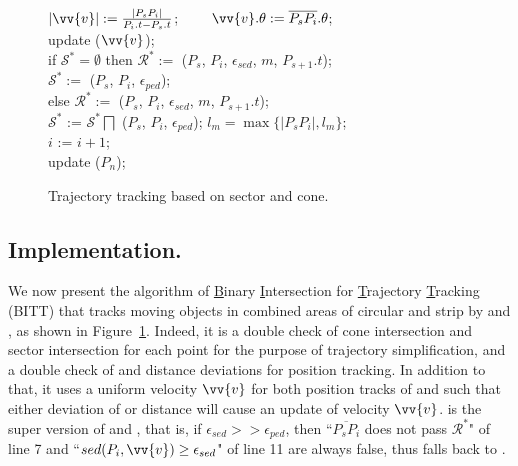 \begin{figure}[tb!]
\begin{center}
{\begin{minipage}{3.3in}
{					\icc \>\hspace{7ex}    $|\vv{v}|:=\frac{|P_sP_{i}|}{P_{i}.t-P_s.t}$; ~~~~$\vv{v}.\theta:=\overline{P_sP_{i}}.\theta$; \\
					\icc \>\hspace{7ex}    update ($\vv{v}$); \\
					\icc \>\hspace{3ex} if $\mathcal{S}^*=\emptyset$ then $\mathcal{R}^*:=$ ($P_s$, $P_{i}$, $\epsilon_{sed}$, $m$, $P_{s+1}.t$); \\
					\icc \>\hspace{7ex}    $\mathcal{S}^*:=$ ($P_s$, $P_{i}$, $\epsilon_{ped}$); \\
					\icc \>\hspace{3ex} else $\mathcal{R}^*:=$ ($P_s$, $P_{i}$, $\epsilon_{sed}$, $m$, $P_{s+1}.t$); \\
					\icc \>\hspace{7ex}    $\mathcal{S}^*$ := $\mathcal{S}^*\bigsqcap$ ($P_s$, $P_{i}$, $\epsilon_{ped}$); $l_{m} = \max\{|P_sP_{i}|, l_{m}\}$;\\
					\icc \>\hspace{3ex} $i$ := $i +1$;\\
					\icc \>\hspace{0ex} update ($P_{n}$); 
				}
				\vspace{-2ex}
				\myhrule
			\end{minipage}
		}
	\end{center}
	\vspace{-2ex}
	\caption{\small Trajectory tracking based on sector and cone.}
	\label{alg:bitt}
	\vspace{-2ex}
\end{figure}

\subsection{Implementation.}
We now present the algorithm of \underline{B}inary \underline{I}ntersection for \underline{T}rajectory \underline{T}racking (BITT) that tracks moving objects in combined areas of circular and strip by \sed and \ped, as shown in Figure~\ref{alg:bitt}. 
%
Indeed, it is a double check of cone intersection and sector intersection for each point for the purpose of trajectory simplification, and a double check of \sed and \ped distance deviations for position tracking. In addition to that, it uses a uniform velocity $\vv{v}$ for both position tracks of \sed and \ped such that either deviation of \ped or \sed distance will cause an update of velocity $\vv{v}$. 
%
\bitt is the super version of \citt and \sitt, that is, if $\epsilon_{sed} >> \epsilon_{ped}$, then ``$\overline{P_sP_{i}}$ does not pass $\mathcal{R}^*$" of line 7 and ``$sed(P_i, \vv{v}) \ge \epsilon_{sed}$" of line 11 are always false, thus \bitt falls back to \sitt. 




